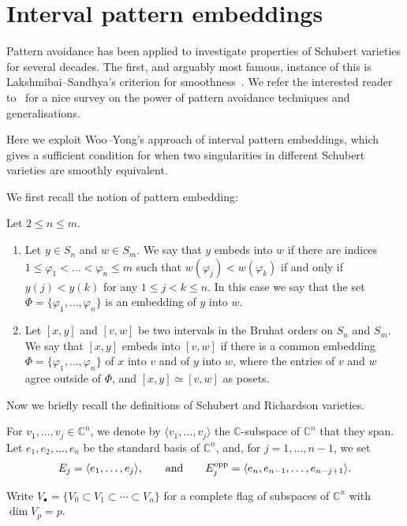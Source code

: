 \documentclass[10pt,a4paper]{amsart}
\numberwithin{equation}{section}
\newcommand{\C}{\mathbb{C}}
\begin{document}
\section{Interval pattern embeddings}
Pattern avoidance has been applied to investigate properties of Schubert varieties for several decades. The first, and arguably most famous, instance of this is Lakshmibai--Sandhya's criterion for smoothness~\cite{lakshmibaisandhya}. We refer the interested reader to~\cite{patternavoidance} for a nice survey on the power of pattern avoidance techniques and generalisations.

Here we exploit Woo--Yong's approach of interval pattern embeddings, which gives a sufficient condition for when two singularities in different Schubert varieties are smoothly equivalent.

We first recall the notion of pattern embedding:

\begin{Definition}\label{defn_patternavoiding} Let $2\leq n\leq m$.
\begin{enumerate}\itemsep=0pt
\item Let $y\in S_n$ and $w\in S_m$. We say that $y$ embeds into $w$ if there are indices $1\leq \varphi_1< \dots< \varphi_n\leq m$ such that $w(\varphi_j)<w(\varphi_{k})$ if and only if $y(j)<y(k)$ for any $1\leq j< k\leq n$. In this case we say that the set $\Phi=\{\varphi_1, \dots, \varphi_n\}$ is an embedding of $y$ into $w$.
\item Let $[x,y]$ and $[v,w]$ be two intervals in the Bruhat orders on $S_n$ and $S_m$. We say that $[x,y]$ embeds into $[v,w]$ if there is a common embedding $\Phi=\{\varphi_1, \dots, \varphi_n\}$ of $x$ into $v$ and of $y$ into $w$, where the entries of $v$ and $w$ agree outside of $\Phi$, and $[x,y]\simeq [v,w]$ as posets.
\end{enumerate}
\end{Definition}


Now we briefly recall the definitions of Schubert and Richardson varieties.

For $v_1, \dots, v_j\in \mathbb{C}^n$, we denote by $\langle v_1, \dots, v_j\rangle$ the $\mathbb{C}$-subspace of $\mathbb{C}^n$ that they span.
 Let $e_1, e_2, \dots, e_n$ be the standard basis of $\mathbb{C}^n$, and, for $j=1, \dots, n-1$, we set
\[
E_j=\langle e_1,\dots, e_j\rangle,\qquad\hbox{and}\qquad E^{\textrm{opp}}_j=\langle e_n, e_{n-1}, \dots, e_{n-j+1}\rangle.
\]

Write $V_\bullet=\{V_0\subset V_1\subset\cdots \subset V_n\}$ for a complete flag of subspaces of $\C^n$ with $\dim V_p=p$.
\end{document}
